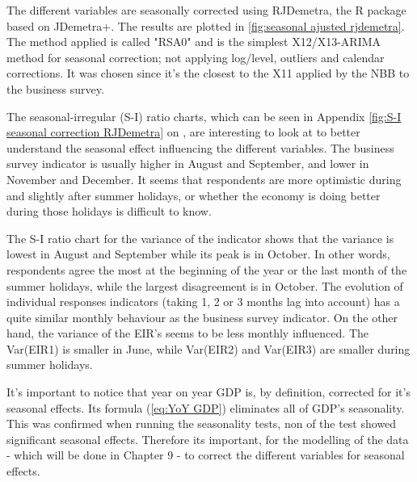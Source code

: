 \documentclass[12pt,a4paper,oneside]{book}
\begin{document}
The different variables are seasonally corrected using RJDemetra, the R package based on JDemetra+.
The results are plotted in \autoref{fig:seasonal ajusted rjdemetra}.
The method applied is called "RSA0" and is the simplest X12/X13-ARIMA method for seasonal correction; not applying log/level, outliers and calendar corrections.
It was chosen since it's the closest to the X11 applied by the NBB to the business survey.



The seasonal-irregular (S-I) ratio charts, which can be seen in Appendix \autoref{fig:S-I seasonal correction RJDemetra} on , are interesting to look at to better understand the seasonal effect influencing the different variables.
The business survey indicator is usually higher in August and September, and lower in November and December. 
It seems that respondents are more optimistic during and slightly after summer holidays, or whether the economy is doing better during those holidays is difficult to know.

The S-I ratio chart for the variance of the indicator shows that the variance is lowest in August and September while its peak is in October. In other words, respondents agree the most at the beginning of the year or the last month of the summer holidays, while the largest disagreement is in October.
The evolution of individual responses indicators (taking 1, 2 or 3 months lag into account) has a quite similar monthly behaviour as the business survey indicator.
On the other hand, the variance of the EIR's seems to be less monthly influenced. The Var(EIR1) is smaller in June, while Var(EIR2) and Var(EIR3) are smaller during summer holidays.

It's important to notice that year on year GDP is, by definition, corrected for it's seasonal effects. Its formula (\autoref{eq:YoY GDP}) eliminates all of GDP's seasonality.
This was confirmed when running the seasonality tests, non of the test showed significant seasonal effects.
Therefore its important, for the modelling of the data - which will be done in Chapter 9 - to correct the different variables for seasonal effects.
\end{document}
